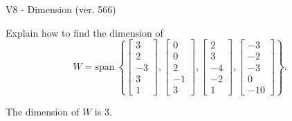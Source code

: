\begin{exercise}
  \begin{exerciseTitle}V8 - Dimension (ver. 566)\end{exerciseTitle}
  \begin{exerciseStatement}
    Explain how to find the dimension of 
\[W=\mathrm{span}\ \left\{\left[\begin{array}{r}
3 \\
2 \\
-3 \\
3 \\
1
\end{array}\right] , \left[\begin{array}{r}
0 \\
0 \\
2 \\
-1 \\
3
\end{array}\right] , \left[\begin{array}{r}
2 \\
3 \\
-4 \\
-2 \\
1
\end{array}\right] , \left[\begin{array}{r}
-3 \\
-2 \\
-3 \\
0 \\
-10
\end{array}\right]\right\}.\]



  \end{exerciseStatement}
  \begin{exerciseAnswer}
   The dimension of \(W\) is  \(3\).
  


  \end{exerciseAnswer}
\end{exercise}